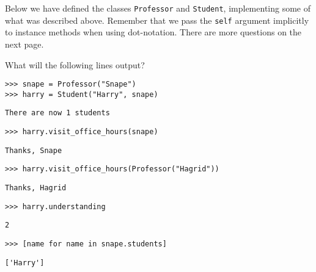 \question
Below we have defined the classes \texttt{Professor} and \texttt{Student}, implementing some of what was described above.
Remember that we pass the \texttt{self} argument implicitly to instance methods when using dot-notation.
There are more questions on the next page.


\newpage

What will the following lines output?
\newline
\begin{lstlisting}
>>> snape = Professor("Snape")
>>> harry = Student("Harry", snape)
\end{lstlisting}
\begin{solution}[.5in]
\begin{lstlisting}
There are now 1 students
\end{lstlisting}
\end{solution}
\begin{lstlisting}
>>> harry.visit_office_hours(snape)
\end{lstlisting}
\begin{solution}[.5in]
\begin{lstlisting}
Thanks, Snape
\end{lstlisting}
\end{solution}

\begin{lstlisting}
>>> harry.visit_office_hours(Professor("Hagrid"))
\end{lstlisting}
\begin{solution}[.5in]
\begin{lstlisting}
Thanks, Hagrid
\end{lstlisting}
\end{solution}

\begin{lstlisting}
>>> harry.understanding
\end{lstlisting}
\begin{solution}[.5in]
\begin{lstlisting}
2
\end{lstlisting}
\end{solution}

\begin{lstlisting}
>>> [name for name in snape.students]
\end{lstlisting}
\begin{solution}[.5in]
\begin{lstlisting}
['Harry']
\end{lstlisting}
\end{solution}

